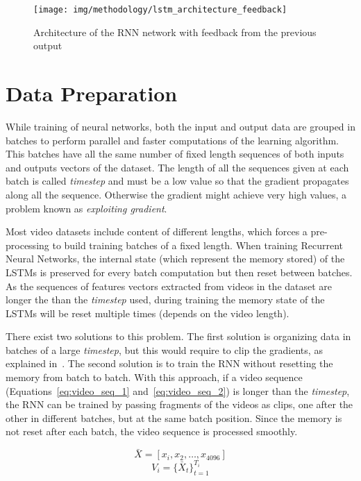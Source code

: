 \begin{figure}[H]
\begin{center}
\texttt{[image: img/methodology/lstm\_architecture\_feedback]}
\end{center}
\caption{Architecture of the RNN network with feedback from the previous output}
\label{fig:lstm_architecture_feedback}
\end{figure}

\section{Data Preparation}

While training of neural networks, both the input and output data are grouped in batches to perform parallel and faster computations of the learning algorithm. This batches have all the same number of fixed length sequences of both inputs and outputs vectors of the dataset.
The length of all the sequences given at each batch is called \textit{timestep} and must be a low value so that the gradient propagates along all the sequence. Otherwise the gradient might achieve very high values, a problem known as \textit{exploiting gradient}.

Most video datasets include content of different lengths, which forces a pre-processing to build training batches of a fixed length.
When training Recurrent Neural Networks, the internal state (which represent the memory stored) of the LSTMs is preserved for every batch computation but then reset between batches. As the sequences of features vectors extracted from videos in the dataset are longer the than the \textit{timestep} used, during training the memory state of the LSTMs will be reset multiple times (depends on the video length).

There exist two solutions to this problem. The first solution is organizing data in batches of a large \textit{timestep}, but this would require to clip the gradients, as explained in~\cite{pascanu2012difficulty}. The second solution is to train the RNN without resetting the memory from batch to batch. With this approach, if a video sequence (Equations~\ref{eq:video_seq_1} and~\ref{eq:video_seq_2}) is longer than the \textit{timestep}, the RNN can be trained by passing fragments of the videos as clips, one after the other in different batches, but at the same batch position. Since the memory is not reset after each batch, the video sequence is processed smoothly.

\begin{equation}
	\bar{X} = [x_i, x_2, \ldots, x_{4096}]
    \label{eq:video_seq_1}
\end{equation}
\begin{equation}
	V_i = \{ \bar{X}_t \}_{t=1}^{T_i}
    \label{eq:video_seq_2}
\end{equation}

